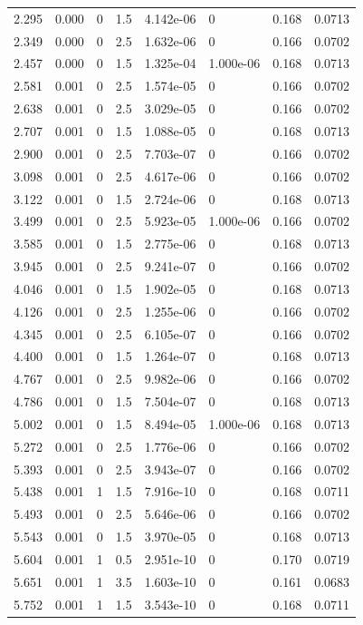 \documentclass[preview]{standalone}
\begin{document}
{{\begin{tabular}{L{1.2cm}C{1.2cm} C{0.3cm}C{0.5cm} C{1.4cm}C{1.4cm} C{1.4cm}C{1.4cm}}
  2.295  &  0.000  & 0     & 1.5 &  4.142e-06  & 0  & 0.168 &  0.0713   \\ 
  2.349  &  0.000  & 0     & 2.5 &  1.632e-06  & 0  & 0.166 &  0.0702   \\ 
  2.457  &  0.000  & 0     & 1.5 &  1.325e-04  & 1.000e-06  & 0.168 &  0.0713   \\ 
  2.581  &  0.001  & 0     & 2.5 &  1.574e-05  & 0  & 0.166 &  0.0702   \\ 
  2.638  &  0.001  & 0     & 2.5 &  3.029e-05  & 0  & 0.166 &  0.0702   \\ 
  2.707  &  0.001  & 0     & 1.5 &  1.088e-05  & 0  & 0.168 &  0.0713   \\ 
  2.900  &  0.001  & 0     & 2.5 &  7.703e-07  & 0  & 0.166 &  0.0702   \\ 
  3.098  &  0.001  & 0     & 2.5 &  4.617e-06  & 0  & 0.166 &  0.0702   \\ 
  3.122  &  0.001  & 0     & 1.5 &  2.724e-06  & 0  & 0.168 &  0.0713   \\ 
  3.499  &  0.001  & 0     & 2.5 &  5.923e-05  & 1.000e-06  & 0.166 &  0.0702   \\ 
  3.585  &  0.001  & 0     & 1.5 &  2.775e-06  & 0  & 0.168 &  0.0713   \\ 
  3.945  &  0.001  & 0     & 2.5 &  9.241e-07  & 0  & 0.166 &  0.0702   \\ 
  4.046  &  0.001  & 0     & 1.5 &  1.902e-05  & 0  & 0.168 &  0.0713   \\ 
  4.126  &  0.001  & 0     & 2.5 &  1.255e-06  & 0  & 0.166 &  0.0702   \\ 
  4.345  &  0.001  & 0     & 2.5 &  6.105e-07  & 0  & 0.166 &  0.0702   \\ 
  4.400  &  0.001  & 0     & 1.5 &  1.264e-07  & 0  & 0.168 &  0.0713   \\ 
  4.767  &  0.001  & 0     & 2.5 &  9.982e-06  & 0  & 0.166 &  0.0702   \\ 
  4.786  &  0.001  & 0     & 1.5 &  7.504e-07  & 0  & 0.168 &  0.0713   \\ 
  5.002  &  0.001  & 0     & 1.5 &  8.494e-05  & 1.000e-06  & 0.168 &  0.0713   \\ 
  5.272  &  0.001  & 0     & 2.5 &  1.776e-06  & 0  & 0.166 &  0.0702   \\ 
  5.393  &  0.001  & 0     & 2.5 &  3.943e-07  & 0  & 0.166 &  0.0702   \\ 
  5.438  &  0.001  & 1     & 1.5 &  7.916e-10  & 0  & 0.168 &  0.0711   \\ 
  5.493  &  0.001  & 0     & 2.5 &  5.646e-06  & 0  & 0.166 &  0.0702   \\ 
  5.543  &  0.001  & 0     & 1.5 &  3.970e-05  & 0  & 0.168 &  0.0713   \\ 
  5.604  &  0.001  & 1     & 0.5 &  2.951e-10  & 0  & 0.170 &  0.0719   \\ 
  5.651  &  0.001  & 1     & 3.5 &  1.603e-10  & 0  & 0.161 &  0.0683   \\ 
  5.752  &  0.001  & 1     & 1.5 &  3.543e-10  & 0  & 0.168 &  0.0711   \\ 
\hline 
\end{tabular} 

}}
\end{document}
